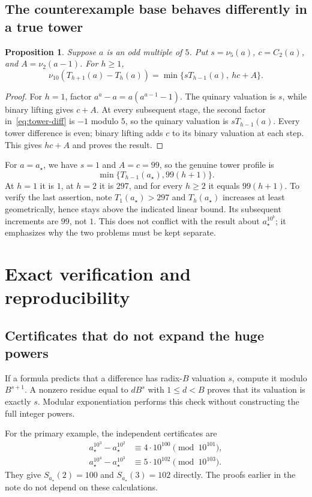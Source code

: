 \documentclass[11pt,a4paper]{article}
\newtheorem{proposition}[theorem]{Proposition}
\theoremstyle{definition}
\newcommand{\astar}{a_{\star}}
\begin{document}
\subsection{The counterexample base behaves differently in a true tower}
\begin{proposition}\label{prop:odd-five-tower}
Suppose $a$ is an odd multiple of $5$. Put
$s=\nu_5(a)$, $c=C_2(a)$, and $A=\nu_2(a-1)$. For $h\ge1$,
\begin{equation}\label{eq:odd-five-tower}
\nu_{10}\!\left(T_{h+1}(a)-T_h(a)\right)
=\min\{sT_{h-1}(a),\ hc+A\}.
\end{equation}
\end{proposition}
\begin{proof}
For $h=1$, factor $a^a-a=a(a^{a-1}-1)$.
The quinary valuation is $s$, while binary lifting gives $c+A$.
At every subsequent stage, the second factor in~\eqref{eq:tower-diff}
is $-1$ modulo $5$, so the quinary valuation is $sT_{h-1}(a)$.
Every tower difference is even; binary lifting adds $c$ to its binary
valuation at each step. This gives $hc+A$ and proves the result.
\end{proof}
For $a=\astar$, we have $s=1$ and $A=c=99$, so the genuine tower profile is
\[
\min\{T_{h-1}(\astar),99(h+1)\}.
\]
At $h=1$ it is $1$, at $h=2$ it is $297$, and for every $h\ge2$ it equals
$99(h+1)$. To verify the last assertion, note $T_1(\astar)>297$ and
$T_h(\astar)$ increases at least geometrically, hence stays above the
indicated linear bound. Its subsequent increments are $99$, not $1$.
This does not conflict with the result about $\astar^{10^b}$; it emphasizes
why the two problems must be kept separate.

\section{Exact verification and reproducibility}\label{sec:verification}

\subsection{Certificates that do not expand the huge powers}
If a formula predicts that a difference has radix-$B$ valuation $s$, compute
it modulo $B^{s+1}$. A nonzero residue equal to $dB^s$ with
$1\le d<B$ proves that its valuation is exactly $s$.
Modular exponentiation performs this check without constructing the full
integer powers.

For the primary example, the independent certificates are
\begin{align}
\astar^{10^3}-\astar^{10^2}&\equiv4\cdot10^{100}\pmod{10^{101}},\label{eq:cert2}\\
\astar^{10^4}-\astar^{10^3}&\equiv5\cdot10^{102}\pmod{10^{103}}.\label{eq:cert3}
\end{align}
They give $S_{\astar}(2)=100$ and $S_{\astar}(3)=102$ directly.
The proofs earlier in the note do not depend on these calculations.
\end{document}
